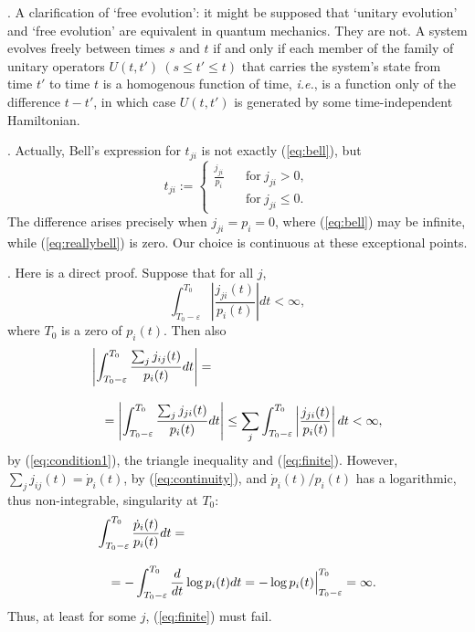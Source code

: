 \documentclass[12pt]{article}
\newcommand{\be}{\begin{equation}}
\newcommand{\ee}{\end{equation}}
\newcommand{\ie}{{\it i.e.}}         %
\renewcommand{\epsilon}{\varepsilon}
\newcommand{\abs}[1]{\left|#1\right|}
\begin{document}
\vspace*{12pt}

.  A clarification of `free evolution':  it might be 
supposed that `unitary evolution' and `free evolution' are equivalent 
in quantum mechanics.  They are not.  A system evolves freely between 
times $s$ and $t$ if and only if each member of the family of unitary 
operators $U(t,t')\ (s \leq t' \leq t)$ that carries the system's 
state from time $t'$ to time $t$ is a homogenous function of time,
\ie, is a function only of the difference $t-t'$, in which case
$U(t,t')$ is generated by some time-independent Hamiltonian.


\vspace*{12pt}

.  Actually, Bell's expression for $t_{ji}$ is not exactly
(\ref{eq:bell}), but
\be
  \label{eq:reallybell}
  t_{ji} := \left\{
  \begin{array}{ll}
    {\displaystyle \frac{j_{ji}}{p_i}} \ \ & \ \ \mbox{for} 
    \ j_{ji} > 0, \\[2ex]
     & \ \ \mbox{for} \ j_{ji} \leq 0.
  \end{array} \right.
\ee
The difference arises precisely when $j_{ji}=p_i=0$, where 
(\ref{eq:bell}) may be infinite, while (\ref{eq:reallybell}) is zero.  
Our choice is continuous at these exceptional points.

\vspace*{12pt}

. Here is a direct proof. Suppose that for all $j$,
  \begin{equation}
    \int_{T_0-\epsilon}^{T_0}\abs{\frac{j_{ji}(t)}{p_i(t)}}dt<\infty,
    \label{eq:finite}
  \end{equation}
where $T_0$ is a zero of $p_i(t)$. Then also
\begin{eqnarray}
  \lefteqn{{\displaystyle
  \abs{\int_{T_0-\epsilon}^{T_0}
  \frac{\sum_j j_{ij}(t)}{p_i(t)}dt}=}}
  \nonumber \\[2ex]   
  & & {\displaystyle
  =\abs{\int_{T_0-\epsilon}^{T_0}\frac{\sum_j j_{ji}(t)}{p_i(t)}dt} 
  \leq
  \sum_j\int_{T_0-\epsilon}^{T_0}\abs{\frac{j_{ji}(t)}{p_i(t)}}dt 
  <\infty, }
\end{eqnarray}
by (\ref{eq:condition1}), the triangle inequality and 
(\ref{eq:finite}).  However, $\sum_j j_{ij}(t)=\dot{p}_i(t)$, by 
(\ref{eq:continuity}), and $\dot{p}_i(t)/p_i(t)$ has a logarithmic, 
thus non-integrable, singularity at $T_0$:
\begin{eqnarray}
  \lefteqn{{\displaystyle
  \int_{T_0-\epsilon}^{T_0}\frac{\dot{p}_i(t)}{p_i(t)}dt=}}
  \nonumber \\[2ex]
  & & {\displaystyle
  =-\int_{T_0-\epsilon}^{T_0}\frac{d}{dt}\log p_i(t)dt=
  -\log p_i(t)\Big|_{T_0-\epsilon}^{T_0}=\infty. }
\end{eqnarray}
Thus, at least for some $j$, (\ref{eq:finite}) must fail.
\end{document}
